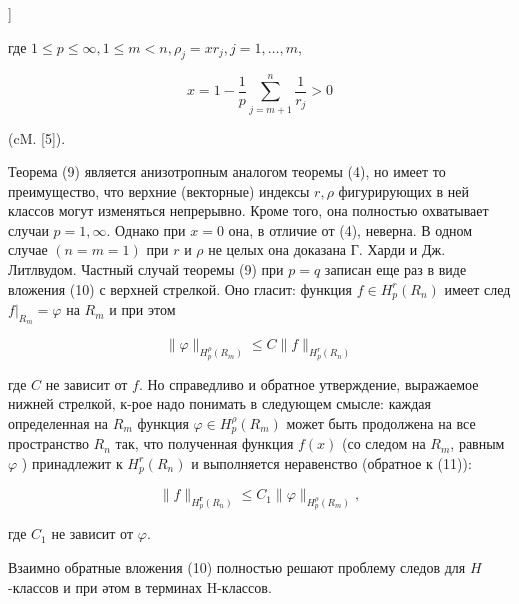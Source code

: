 \documentclass[10pt]{article}
\begin{document}
]



где $1 \leqslant p \leqslant \infty, 1 \leqslant m<n, \rho_{j}=x r_{j}, j=1, \ldots, m$,



\[

x=1-\frac{1}{p} \sum_{j=m+1}^{n} \frac{1}{r_{j}}>0

\]



(cM. [5]).



Теорема (9) является анизотропным аналогом теоремы (4), но имеет то преимущество, что верхние (векторные) индексы $r, \rho$ фигурирующих в ней классов могут изменяться непрерывно. Кроме того, она полностью охватывает случаи $p=1, \infty$. Однако при $x=0$ она, в отличие от (4), неверна. В одном случае $(n=m=1)$ при $r$ и $\rho$ не целых она доказана Г. Харди и Дж. Литлвудом. Частный случай теоремы (9) при $p=q$ записан еще раз в виде вложения (10) с верхней стрелкой. Оно гласит: функция $f \in H_{p}^{r}\left(R_{n}\right)$ имеет след $\left.f\right|_{R_{m}}=\varphi$ на $R_{m}$ и при этом



\[

\|\varphi\|_{H_{p}^{\rho}\left(R_{m}\right)} \leqslant C\|f\|_{H_{p}^{r}\left(R_{n}\right)}

\]



где $C$ не зависит от $f$. Но справедливо и обратное утверждение, выражаемое нижней стрелкой, к-рое надо понимать в следующем смысле: каждая определенная на $R_{m}$ функция $\varphi \in H_{p}^{\rho}\left(R_{m}\right)$ может быть продолжена на все пространство $R_{n}$ так, что полученная функция $f(x)$ (со следом на $R_{m}$, равным $\varphi$ ) принадлежит к $H_{p}^{r}\left(R_{n}\right)$ и выполняется неравенство (обратное к (11)):



\[

\|f\|_{H_{p}^{\boldsymbol{r}}\left(R_{n}\right)} \leqslant C_{1}\|\varphi\|_{H_{p}^{\rho}\left(R_{m}\right)},

\]



где $C_{1}$ не зависит от $\varphi$.



Взаимно обратные вложения (10) полностью решают проблему следов для $H$-классов и при әтом в терминах H-классов.
\end{document}
